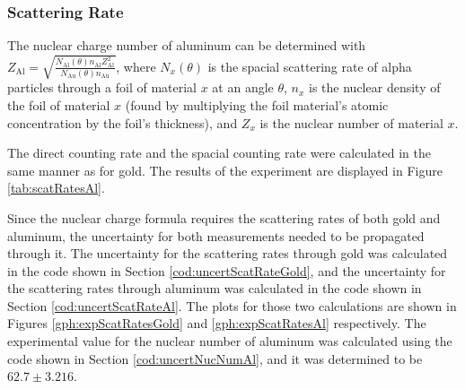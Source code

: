 \documentclass[a4paper]{article}
\begin{document}
\subsubsection{Scattering Rate}

\qq The nuclear charge number of aluminum can be determined with \\
\( Z_{\text{Al}} = \sqrt{\frac{N_{\text{Al}} (\theta) n_{\text{Al}}
    Z^2_{\text{Al}}}{N_{\text{Au}} (\theta) n_{\text{Au}}}} \), where
\( N_x (\theta) \) is the spacial scattering rate of alpha particles through a
foil of material \( x \) at an angle \( \theta \), \( n_x \) is the nuclear
density of the foil of material \( x \) (found by multiplying the foil
material's atomic concentration by the foil's thickness), and \( Z_x \) is the
nuclear number of material \( x \).

\qq The direct counting rate and the spacial counting rate were calculated in
the same manner as for gold. The results of the experiment are displayed in
Figure \ref{tab:scatRatesAl}.

\qq

\qq Since the nuclear charge formula requires the scattering rates of both gold
and aluminum, the uncertainty for both measurements needed to be propagated
through it. The uncertainty for the scattering rates through gold was calculated
in the code shown in Section \ref{cod:uncertScatRateGold}, and the uncertainty
for the scattering rates through aluminum was calculated in the code shown in
Section \ref{cod:uncertScatRateAl}. The plots for those two calculations are
shown in Figures \ref{gph:expScatRatesGold} and \ref{gph:expScatRatesAl}
respectively. The experimental value for the nuclear number of aluminum was
calculated using the code shown in Section \ref{cod:uncertNucNumAl}, and it was
determined to be \( 62.7 \pm 3.216 \).
\end{document}
